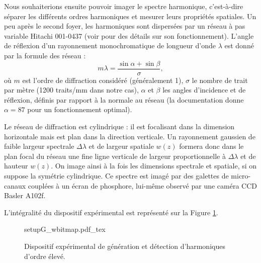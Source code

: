 Nous souhaiterions ensuite pouvoir imager le spectre harmonique, c'est-à-dire séparer les différents ordres harmoniques et mesurer leurs propriétés spatiales. Un peu après le second foyer, les harmoniques sont dispersées par un réseau à pas variable Hitachi 001-0437 (voir  pour des détails sur son fonctionnement). L'angle de réflexion d'un rayonnement monochromatique de longueur d'onde $\lambda$ est donné par la formule des réseau :
\begin{equation*}
m\lambda=\frac{\sin{\alpha}+\sin{\beta}}{\sigma},
\end{equation*}
où $m$ est l'ordre de diffraction considéré (généralement 1), $\sigma$ le nombre de trait par mètre (1200 traits/mm dans notre cas), $\alpha$ et $\beta$ les angles d'incidence et de réflexion, définis par rapport à la normale au réseau (la documentation donne $\alpha = 87$\degres{} pour un fonctionnement optimal).\par
Le réseau de diffraction est cylindrique : il est focalisant dans la dimension horizontale mais est plan dans la direction verticale. Un rayonnement gaussien de faible largeur spectrale $\Delta\lambda$ et de largeur spatiale $w(z)$ formera donc dans le plan focal du réseau une fine ligne verticale de largeur proportionnelle à $\Delta\lambda$ et de hauteur $w(z)$. On image ainsi à la fois les dimensions spectrale et spatiale, si on suppose la symétrie cylindrique. Ce spectre est imagé par des galettes de micro-canaux couplées à un écran de phosphore, lui-même observé par une caméra CCD Basler A102f. 

L'intégralité du dispositif expérimental est représenté sur la Figure \ref{Fig:ExpG}.

\vspace{\baselineskip}
\begin{figure}[!ht]
\centering
\def\svgwidth{\columnwidth}
{setupG_wbitmap.pdf_tex}
\caption{Dispositif expérimental de génération et détection d'harmoniques d'ordre élevé.}
\label{Fig:ExpG}
\end{figure}

